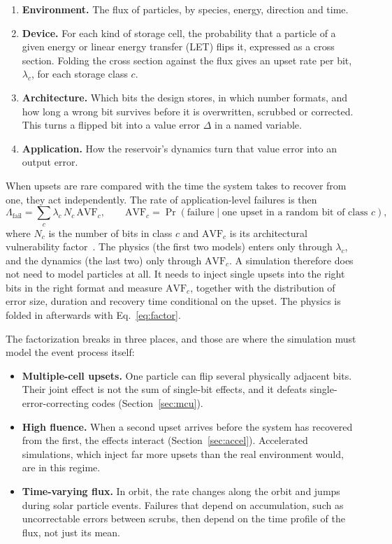 \documentclass[11pt,a4paper]{article}
\newcommand{\AVF}{\mathrm{AVF}}
\begin{document}
\begin{enumerate}
  \item \textbf{Environment.} The flux of particles, by species, energy, direction and time.
  \item \textbf{Device.} For each kind of storage cell, the probability that a particle of a given energy or linear energy transfer (LET) flips it, expressed as a cross section. Folding the cross section against the flux gives an upset rate per bit, $\lambda_c$, for each storage class $c$.
  \item \textbf{Architecture.} Which bits the design stores, in which number formats, and how long a wrong bit survives before it is overwritten, scrubbed or corrected. This turns a flipped bit into a value error $\Delta$ in a named variable.
  \item \textbf{Application.} How the reservoir's dynamics turn that value error into an output error.
\end{enumerate}
When upsets are rare compared with the time the system takes to recover from one, they act independently. The rate of application-level failures is then
\begin{equation}
\Lambda_{\mathrm{fail}} = \sum_{c} \lambda_c \, N_c \, \AVF_c,
\qquad
\AVF_c = \Pr\left(\text{failure} \mid \text{one upset in a random bit of class } c\right),
\label{eq:factor}
\end{equation}
where $N_c$ is the number of bits in class $c$ and $\AVF_c$ is its architectural vulnerability factor~\cite{mukherjee2003}. The physics (the first two models) enters only through $\lambda_c$, and the dynamics (the last two) only through $\AVF_c$. A simulation therefore does not need to model particles at all. It needs to inject single upsets into the right bits in the right format and measure $\AVF_c$, together with the distribution of error size, duration and recovery time conditional on the upset. The physics is folded in afterwards with Eq.~\eqref{eq:factor}.

The factorization breaks in three places, and those are where the simulation must model the event process itself:
\begin{itemize}
  \item \textbf{Multiple-cell upsets.} One particle can flip several physically adjacent bits. Their joint effect is not the sum of single-bit effects, and it defeats single-error-correcting codes (Section~\ref{sec:mcu}).
  \item \textbf{High fluence.} When a second upset arrives before the system has recovered from the first, the effects interact (Section~\ref{sec:accel}). Accelerated simulations, which inject far more upsets than the real environment would, are in this regime.
  \item \textbf{Time-varying flux.} In orbit, the rate changes along the orbit and jumps during solar particle events. Failures that depend on accumulation, such as uncorrectable errors between scrubs, then depend on the time profile of the flux, not just its mean.
\end{itemize}
\end{document}
